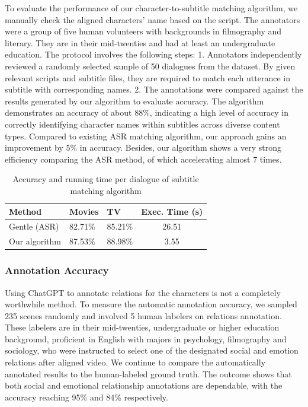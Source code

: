 To evaluate the performance of our character-to-subtitle matching algorithm, we manually check the aligned characters' name based on the script. The annotators were a group of five human volunteers with backgrounds in filmography and literary. They are in their mid-twenties and had at least an undergraduate education. The protocol involves the following steps: 1. Annotators independently reviewed a randomly selected sample of 50 dialogues from the dataset. By given relevant scripts and subtitle files, they are required to match each utterance in subtitle with corresponding names. 2. The annotations were compared against the results generated by our algorithm to evaluate accuracy. The algorithm demonstrates an accuracy of about 88\%, indicating a high level of accuracy in correctly identifying character names within subtitles across diverse content types. Compared to existing ASR matching algorithm, our approach gains an improvement by 5\% in accuracy. Besides, our algorithm shows a very strong efficiency comparing the ASR method, of which accelerating almost 7 times.

\begin{table}[ht]
    \small
    \centering
    \begin{tabular}{lllc}
        \hline
        \textbf{Method} & \textbf{Movies} & \textbf{TV} & \textbf{Exec. Time (s)}\\
        \hline
        Gentle (ASR) & 82.71\% & 85.21\% & 26.51\\
        \hline
        Our algorithm & 87.53\% & 88.98\% & 3.55\\
        \hline
    \end{tabular}
    \caption{Accuracy and running time per dialogue of subtitle matching algorithm}
\label{table:alg_eval}
\end{table}

\subsubsection{Annotation Accuracy}
Using ChatGPT to annotate relations for the characters is not a completely worthwhile method. To measure the automatic annotation accuracy, we sampled 235 scenes randomly and involved 5 human labelers on relations annotation. These labelers are in their mid-twenties, 
undergraduate or higher education background, proficient in English with majors in psychology, filmography and sociology, who were instructed to select one of the designated social and emotion relations after aligned video. We continue to compare the automatically annotated results to the human-labeled ground truth. The outcome shows that both social and emotional relationship annotations are dependable, with the accuracy reaching 95\% and 84\% respectively.

